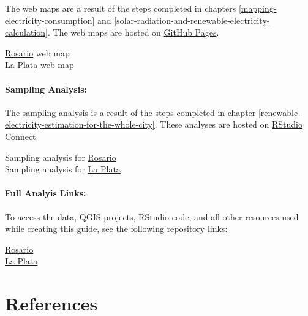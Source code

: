 \documentclass[
]{book}
\begin{document}
The web maps are a result of the steps completed in chapters \ref{mapping-electricity-consumption} and \ref{solar-radiation-and-renewable-electricity-calculation}. The web maps are hosted on \href{https://pages.github.com/}{GitHub Pages}.

\href{https://einavg7.github.io/Rosario_Solar_Potential/}{Rosario} web map\\
\href{https://einavg7.github.io/LaPlata_Solar_Potential/}{La Plata} web map

\hypertarget{sampling-analysis}{%
\subsubsection*{Sampling Analysis:}\label{sampling-analysis}}

The sampling analysis is a result of the steps completed in chapter \ref{renewable-electricity-estimation-for-the-whole-city}. These analyses are hosted on \href{https://www.rstudio.com/products/connect/}{RStudio Connect}.

Sampling analysis for \href{https://bookdown.org/einavg7/sampling_ros/sampling_ros.html}{Rosario}\\
Sampling analysis for \href{https://bookdown.org/einavg7/laplata_sampling/laplata_sampling.html}{La Plata}

\hypertarget{full-analyis-links}{%
\subsubsection*{Full Analyis Links:}\label{full-analyis-links}}

To access the data, QGIS projects, RStudio code, and all other resources used while creating this guide, see the following repository links:

\href{https://github.com/Einavg7/Rosario_Solar_Potential}{Rosario}\\
\href{https://github.com/Einavg7/LaPlata_Solar_Potential}{La Plata}

\hypertarget{references}{%
\chapter{References}\label{references}}
\end{document}
